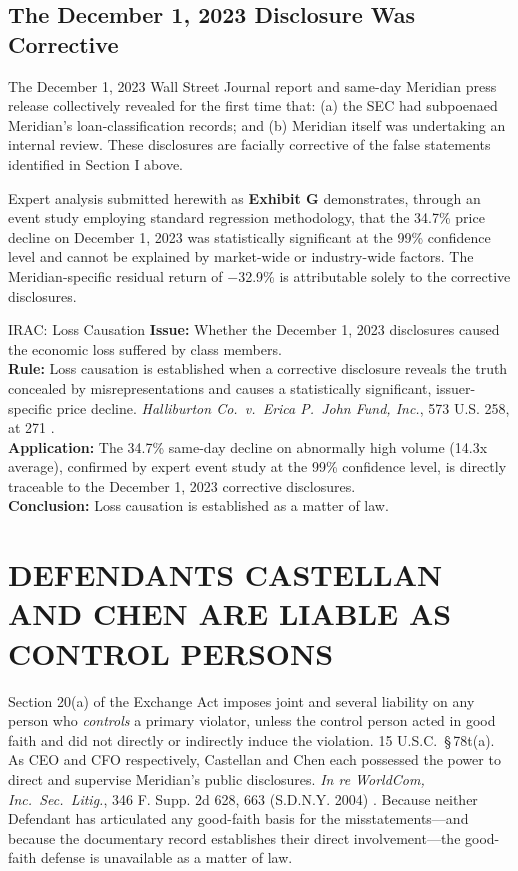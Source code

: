 \documentclass[12pt,letterpaper]{article}
\newcommand{\caseref}[5]{%
  \textit{#1}, #2 #3 #4 (#5)%
}
\newcommand{\caseshort}[3]{%
  \textit{#1}, #2, at #3%
}
\begin{document}
\subsection{The December 1, 2023 Disclosure Was Corrective}

The December 1, 2023 Wall Street Journal report and same-day Meridian press release collectively revealed for the first time that: (a) the SEC had subpoenaed Meridian's loan-classification records; and (b) Meridian itself was undertaking an internal review. These disclosures are facially corrective of the false statements identified in Section I above.

Expert analysis submitted herewith as \textbf{Exhibit G} demonstrates, through an event study employing standard regression methodology, that the 34.7\% price decline on December 1, 2023 was statistically significant at the 99\% confidence level and cannot be explained by market-wide or industry-wide factors. The Meridian-specific residual return of $-$32.9\% is attributable solely to the corrective disclosures.

\begin{iracblock}{IRAC: Loss Causation}
\textbf{Issue:} Whether the December 1, 2023 disclosures caused the economic loss suffered by class members.\\[4pt]
\textbf{Rule:} Loss causation is established when a corrective disclosure reveals the truth concealed by misrepresentations and causes a statistically significant, issuer-specific price decline. \caseshort{Halliburton Co.\ v.\ Erica P.\ John Fund, Inc.}{573 U.S. 258}{271}.\\[4pt]
\textbf{Application:} The 34.7\% same-day decline on abnormally high volume (14.3x average), confirmed by expert event study at the 99\% confidence level, is directly traceable to the December 1, 2023 corrective disclosures.\\[4pt]
\textbf{Conclusion:} Loss causation is established as a matter of law.
\end{iracblock}

\section{DEFENDANTS CASTELLAN AND CHEN ARE LIABLE AS CONTROL PERSONS}

Section 20(a) of the Exchange Act imposes joint and several liability on any person who \textit{controls} a primary violator, unless the control person acted in good faith and did not directly or indirectly induce the violation. 15 U.S.C.\ \S\,78t(a). As CEO and CFO respectively, Castellan and Chen each possessed the power to direct and supervise Meridian's public disclosures. \caseref{In re WorldCom, Inc.\ Sec.\ Litig.}{346}{F. Supp. 2d}{628, 663}{S.D.N.Y. 2004}. Because neither Defendant has articulated any good-faith basis for the misstatements---and because the documentary record establishes their direct involvement---the good-faith defense is unavailable as a matter of law.
\end{document}

